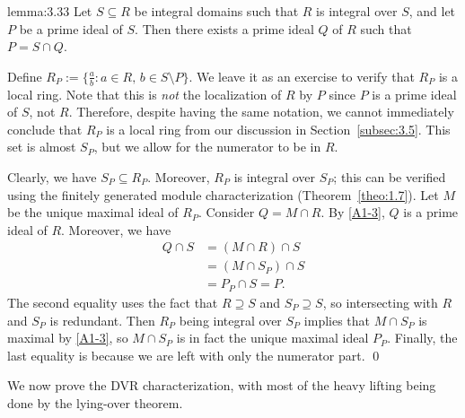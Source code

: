 \begin{lemma}{lemma:3.33}
    Let $S \subseteq R$ be integral domains such that $R$ is integral over $S$, 
    and let $P$ be a prime ideal of $S$. Then there exists a prime ideal $Q$ 
    of $R$ such that $P = S \cap Q$. 
\end{lemma}\vspace{-0.25cm}\newpage
\begin{pf}
    Define $R_P := \{\frac{a}{b} : a \in R,\, b \in S \setminus P\}$. 
    We leave it as an exercise to verify that $R_P$ is a local ring. 
    Note that this is \emph{not} the localization of $R$ by $P$ since $P$ is a prime 
    ideal of $S$, not $R$. Therefore, despite having the same notation, we cannot immediately 
    conclude that $R_P$ is a local ring from our discussion in Section~\ref{subsec:3.5}. This set 
    is almost $S_P$, but we allow for the numerator to be in $R$.

    Clearly, we have $S_P \subseteq R_P$. Moreover, $R_P$ is integral over $S_P$; 
    this can be verified using the finitely generated module characterization 
    (Theorem~\ref{theo:1.7}). 
    Let $M$ be the unique maximal ideal of $R_P$. Consider $Q = M \cap R$. By \ref{A1-3}, 
    $Q$ is a prime ideal of $R$. Moreover, we have 
    \begin{align*}
        Q \cap S &= (M \cap R) \cap S \\ 
        &= (M \cap S_P) \cap S \\
        &= P_P \cap S = P.
    \end{align*}
    The second equality uses the fact that $R \supseteq S$ and $S_P \supseteq S$, so 
    intersecting with $R$ and $S_P$ is redundant. Then $R_P$ being integral over $S_P$ 
    implies that $M \cap S_P$ is maximal by \ref{A1-3}, so $M \cap S_P$ is in fact 
    the unique maximal ideal $P_P$. Finally, the last equality is because we are left 
    with only the numerator part. \qed 
\end{pf}\vspace{-0.25cm}
We now prove the DVR characterization, with most of the heavy lifting being done 
by the lying-over theorem. 
